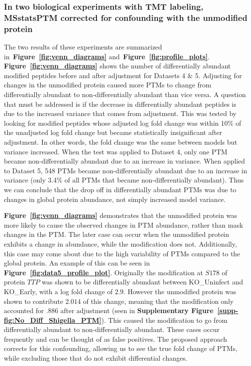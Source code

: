 \documentclass[mcp]{article}
\numberwithin{table}{section}
\def\figref#1{{\bf Figure~\ref{fig:#1}}}
\begin{document}
\subsubsection*{In two biological experiments with TMT labeling, MSstatsPTM corrected for confounding with the unmodified protein}

The two results of these experiments are summarized in~\figref{venn_diagrams} and~\figref{profile_plots}. \figref{venn_diagrams} shows the number of differentially abundant modified peptides before and after adjustment for Datasets 4 \& 5. Adjusting for changes in the unmodified protein caused more PTMs to change from differentially abundant to non-differentially abundant than vice versa. A question that must be addressed is if the decrease in differentially abundant peptides is due to the increased variance that comes from adjustment. This was tested by looking for modified peptides whose adjusted log fold change was within 10\% of the unadjusted log fold change but became statistically insignificant after adjustment. In other words, the fold change was the same between models but variance increased. When the test was applied to Dataset 4, only one PTM became non-differentially abundant due to an increase in variance. When applied to Dataset 5, 548 PTMs became non-differentially abundant due to an increase in variance (only 3.4\% of all PTMs that became non-differentially abundant). Thus we can conclude that the drop off in differentially abundant PTMs was due to changes in global protein abundance, not simply increased model variance.

\figref{venn_diagrams} demonstrates that the unmodified protein was more likely to cause the observed changes in PTM abundance, rather than mask changes in the PTM. The later case can occur when the unmodified protein exhibits a change in abundance, while the modification does not. Additionally, this case may come about due to the high variability of PTMs compared to the global protein. An example of this can be seen in \figref{data5_profile_plot}. Originally the modification at $S178$ of protein $TTP$ was shown to be differentially abundant between KO\_Uninfect and KO\_Early, with a log fold change of $2.9$. However the unmodified protein was shown to contribute $2.014$ of this change, meaning that the modification only accounted for $.886$ after adjustment (seen in {\bf Supplementary Figure~\ref{supp-fig:No_Diff_Shigella_PTM}}). This caused the modification to go from differentially abundant to non-differentially abundant. These cases occur frequently and can be thought of as false positives. The proposed approach corrects for this confounding, allowing us to see the true fold change of PTMs, while excluding those that do not exhibit differential changes.
\end{document}
